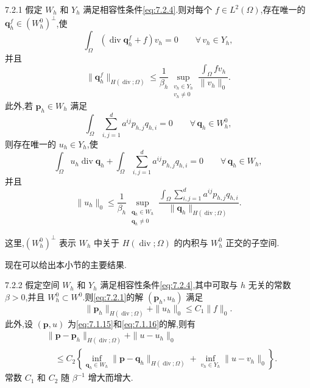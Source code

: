 \begin{proposition}[]{7.2.1}
假定 \(W_h\) 和 \(Y_h\) 满足相容性条件\eqref{eq:7.2.4}.则对每个 \(f\in L^2(\Omega)\),存在唯一的 \(\boldsymbol{q}_h^f\in(W_h^0)^\perp\),使
\begin{equation}\label{eq:7.2.7}
  \int_\Omega(\operatorname{div}\boldsymbol{q}_h^f+f)v_h=0
    \qquad\forall\,v_h\in Y_h,
\end{equation}
并且
\begin{equation}\label{eq:7.2.8}
  \|\boldsymbol{q}_h^f\|_{H(\operatorname{div};\Omega)}
    \le\frac{1}{\beta_h}\sup_{\substack{v_h\in Y_h\\v_h\ne0}}
       \frac{\int_\Omega fv_h}{\|v_h\|_0}.
\end{equation}
此外,若 \(\boldsymbol{p}_h\in W_h\) 满足
\begin{equation}\label{eq:7.2.9}
  \int_\Omega\sum_{i,j=1}^d a^{ij}p_{h,j}q_{h,i}=0
     \qquad\forall\,\boldsymbol{q}_h\in W_h^0,
\end{equation}
则存在唯一的 \(u_h\in Y_h\),使
\begin{equation}\label{eq:7.2.10}
  \int_\Omega u_h\operatorname{div}\boldsymbol{q}_h
     +\int_\Omega\sum_{i,j=1}^d a^{ij}p_{h,j}q_{h,i}=0
     \qquad\forall\,\boldsymbol{q}_h\in W_h,
\end{equation}
并且
\begin{equation}\label{eq:7.2.11}
  \|u_h\|_0\le\frac{1}{\beta_h}\sup_{\substack{\boldsymbol{q}_h\in W_h\\\boldsymbol{q}_h\ne0}}
     \frac{\int_\Omega\sum_{i,j=1}^d a^{ij}p_{h,j}q_{h,i}}
          {\|\boldsymbol{q}_h\|_{H(\operatorname{div};\Omega)}}.
\end{equation}
\end{proposition}

这里,\((W_h^0)^\perp\) 表示 \(W_h\) 中关于 \(H(\operatorname{div};\Omega)\) 的内积与 \(W_h^0\) 正交的子空间.

现在可以给出本小节的主要结果.

\begin{theorem}[稳定性与收敛性]{7.2.2}
假定空间 \(W_h\) 和 \(Y_h\) 满足相容性条件\eqref{eq:7.2.4},其中可取与 \(h\) 无关的常数 \(\beta>0\),并且 \(W_h^0\subset W^0\).则\eqref{eq:7.2.1}的解 \((\boldsymbol{p}_h,u_h)\) 满足
\begin{equation}\label{eq:7.2.12}
  \|\boldsymbol{p}_h\|_{H(\operatorname{div};\Omega)}+\|u_h\|_0\le C_1\|f\|_0.
\end{equation}
此外,设 \((\boldsymbol{p},u)\) 为\eqref{eq:7.1.15}和\eqref{eq:7.1.16}的解,则有
\begin{equation}\label{eq:7.2.13}
  \begin{aligned}
    &\|\boldsymbol{p}-\boldsymbol{p}_h\|_{H(\operatorname{div};\Omega)}+\|u-u_h\|_0\\
    &\quad\le C_2\left\{\inf_{\boldsymbol{q}_h\in W_h}
       \|\boldsymbol{p}-\boldsymbol{q}_h\|_{H(\operatorname{div};\Omega)}
        +\inf_{v_h\in Y_h}\|u-v_h\|_0\right\}.
  \end{aligned}
\end{equation}
常数 \(C_1\) 和 \(C_2\) 随 \(\beta^{-1}\) 增大而增大.
\end{theorem}

